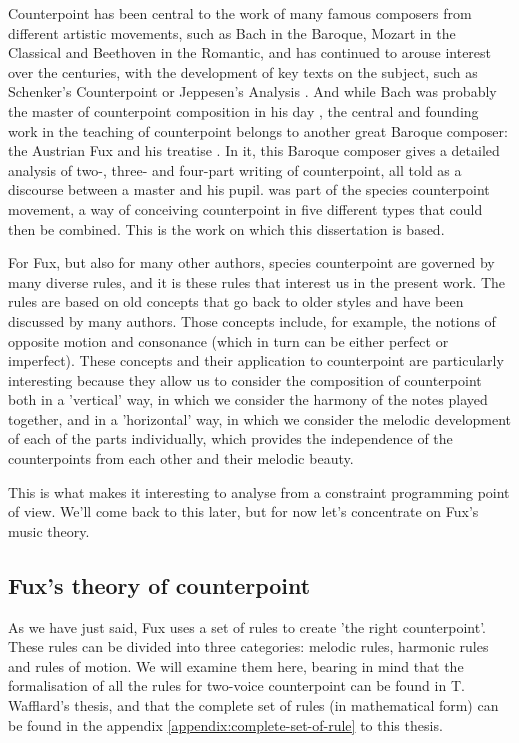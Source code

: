 Counterpoint has been central to the work of many famous composers from different artistic movements, such as Bach in the Baroque, Mozart in the Classical and Beethoven in the Romantic, and has continued to arouse interest over the centuries, with the development of key texts on the subject, such as Schenker's Counterpoint \cite{schenker1906} or Jeppesen's Analysis \cite{jeppesen1960}. And while Bach was probably the master of counterpoint composition in his day \cite{yearsley2002}, the central and founding work in the teaching of counterpoint belongs to another great Baroque composer: the Austrian Fux and his treatise \gap. In it, this Baroque composer gives a detailed analysis of two-, three- and four-part writing of counterpoint, all told as a discourse between a master and his pupil. \gaps  was part of the species counterpoint movement, a way of conceiving counterpoint in five different types that could then be combined. This is the work on which this dissertation is based. 


For Fux, but also for many other authors, species counterpoint are governed by many diverse rules, and it is these rules that interest us in the present work. The rules are based on old concepts that go back to older styles \cite{crocker1962} and have been discussed by many authors.  Those concepts include, for example, the notions of opposite motion and consonance (which in turn can be either perfect or imperfect). These concepts and their application to counterpoint are particularly interesting because they allow us to consider the composition of counterpoint both in a 'vertical' way, in which we consider the harmony of the notes played together, and in a 'horizontal' way, in which we consider the melodic development of each of the parts individually, which provides the independence of the counterpoints from each other and their melodic beauty.

This is what makes it interesting to analyse from a constraint programming point of view. We'll come back to this later, but for now let's concentrate on Fux's music theory.

\subsection{Fux's theory of counterpoint}
As we have just said, Fux uses a set of rules to create 'the right counterpoint'. These rules can be divided into three categories: melodic rules, harmonic rules and rules of motion. We will examine them here, bearing in mind that the formalisation of all the rules for two-voice counterpoint can be found in T. Wafflard's thesis, and that the complete set of rules (in mathematical form) can be found in the appendix \ref{appendix:complete-set-of-rule} to this thesis.

